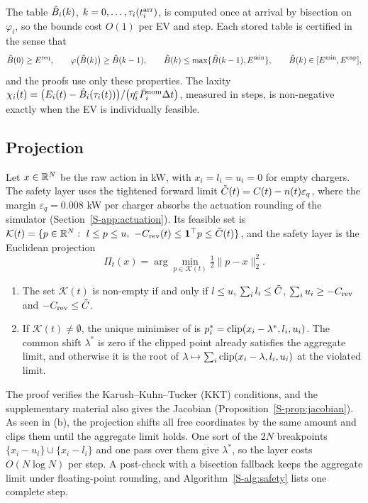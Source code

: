 The table $\hat B_i(k)$, $k=0,\dots,\tau_i(t_i^{\mathrm{arr}})$, is computed once at arrival by bisection on $\varphi_i$, so the bounds cost $O(1)$ per EV and step.
Each stored table is certified in the sense that
\begin{equation}\label{eq:certified}
\hat B(0)\ge E^{\mathrm{req}},\qquad \varphi\big(\hat B(k)\big)\ge\hat B(k-1),\qquad \hat B(k)\le\max\{\hat B(k-1),E^{\min}\},\qquad \hat B(k)\in[E^{\min},E^{\mathrm{cap}}],
\end{equation}
and the proofs use only these properties.
The laxity $\chi_i(t)=\big(E_i(t)-\hat B_i(\tau_i(t))\big)/\big(\eta_i^{\mathrm c}\bar P^{\mathrm{nom}}_i\Delta t\big)$, measured in steps, is non-negative exactly when the EV is individually feasible.

\subsection{Projection}\label{sec:projection}

Let $x\in\mathbb R^N$ be the raw action in kW, with $x_i=l_i=u_i=0$ for empty chargers.
The safety layer uses the tightened forward limit $\tilde C(t)=C(t)-n(t)\varepsilon_q$, where the margin $\varepsilon_q=0.008$ kW per charger absorbs the actuation rounding of the simulator (Section~\ref{S-app:actuation}).
Its feasible set is $\mathcal K(t)=\{p\in\mathbb R^N:\ l\le p\le u,\ -C_{\mathrm{rev}}(t)\le\mathbf 1^\top p\le\tilde C(t)\}$, and the safety layer is the Euclidean projection
\begin{equation}\label{eq:proj}
\Pi_t(x)=\arg\min_{p\in\mathcal K(t)}\tfrac12\|p-x\|_2^2 .
\end{equation}

\begin{proposition}[Projection]\label{prop:projection}
\begin{enumerate}
\item[(i)] The set $\mathcal K(t)$ is non-empty if and only if $l\le u$, $\sum_il_i\le\tilde C$, $\sum_iu_i\ge-C_{\mathrm{rev}}$ and $-C_{\mathrm{rev}}\le\tilde C$.
\item[(ii)] If $\mathcal K(t)\neq\emptyset$, the unique minimiser of  is $p_i^{*}=\operatorname{clip}(x_i-\lambda^{*},l_i,u_i)$. The common shift $\lambda^{*}$ is zero if the clipped point already satisfies the aggregate limit, and otherwise it is the root of $\lambda\mapsto\sum_i\operatorname{clip}(x_i-\lambda,l_i,u_i)$ at the violated limit.
\end{enumerate}
\end{proposition}

The proof verifies the Karush--Kuhn--Tucker (KKT) conditions, and the supplementary material also gives the Jacobian (Proposition~\ref{S-prop:jacobian}).
As seen in (b), the projection shifts all free coordinates by the same amount and clips them until the aggregate limit holds.
One sort of the $2N$ breakpoints $\{x_i-u_i\}\cup\{x_i-l_i\}$ and one pass over them give $\lambda^{*}$, so the layer costs $O(N\log N)$ per step.
A post-check with a bisection fallback keeps the aggregate limit under floating-point rounding, and Algorithm~\ref{S-alg:safety} lists one complete step.

